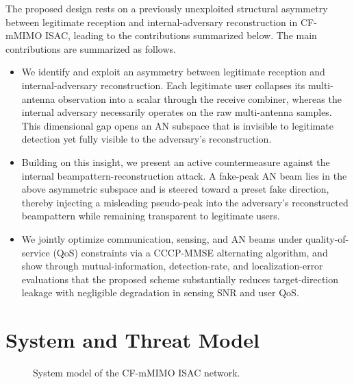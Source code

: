 \documentclass[lettersize,journal]{IEEEtran}
\newcommand{\FigOneWidth}{0.98\columnwidth}
\begin{document}
The proposed design rests on a previously unexploited structural asymmetry between legitimate reception and internal-adversary reconstruction in CF-mMIMO ISAC, leading to the contributions summarized below. The main contributions are summarized as follows.
\begin{itemize}
\item We identify and exploit an asymmetry between legitimate reception and internal-adversary reconstruction. Each legitimate user collapses its multi-antenna observation into a scalar through the receive combiner, whereas the internal adversary necessarily operates on the raw multi-antenna samples. This dimensional gap opens an AN subspace that is invisible to legitimate detection yet fully visible to the adversary's reconstruction.
\item Building on this insight, we present an active countermeasure against the internal beampattern-reconstruction attack. A fake-peak AN beam lies in the above asymmetric subspace and is steered toward a preset fake direction, thereby injecting a misleading pseudo-peak into the adversary's reconstructed beampattern while remaining transparent to legitimate users.
\item We jointly optimize communication, sensing, and AN beams under quality-of-service (QoS) constraints via a CCCP-MMSE alternating algorithm, and show through mutual-information, detection-rate, and localization-error evaluations that the proposed scheme substantially reduces target-direction leakage with negligible degradation in sensing SNR and user QoS.
\end{itemize}

\section{System and Threat Model}
\begin{figure}[t]
    \centering
    \resizebox{\FigOneWidth}{!}{}
    \caption{System model of the CF-mMIMO ISAC network.}
    \label{fig:layout}
\end{figure}
\end{document}
